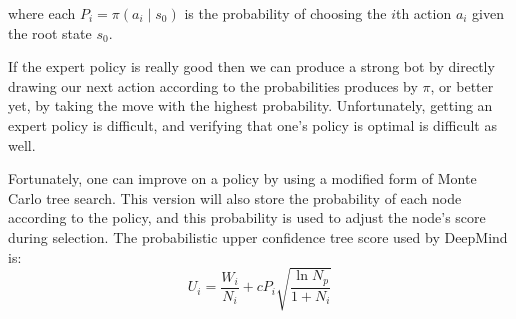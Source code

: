 \documentclass[10pt]{article}
\begin{document}
\begin{figure}[H]
\end{figure}
\vspace{-1em}
where each $P_i = \pi(a_i \mid s_0)$ is the probability of choosing the $i$th action $a_i$ given the root state $s_0$.

If the expert policy is really good then we can produce a strong bot by directly drawing our next action according to the probabilities produces by $\pi$, or better yet, by taking the move with the highest probability.
Unfortunately, getting an expert policy is difficult, and verifying that one's policy is optimal is difficult as well.

Fortunately, one can improve on a policy by using a modified form of Monte Carlo tree search.
This version will also store the probability of each node according to the policy, and this probability is used to adjust the node's score during selection.
The probabilistic upper confidence tree score used by DeepMind is:
\[
U_i = \frac{W_i}{N_i} + c P_i\sqrt{\frac{\ln N_p}{1 + N_i}}
\]
\end{document}
